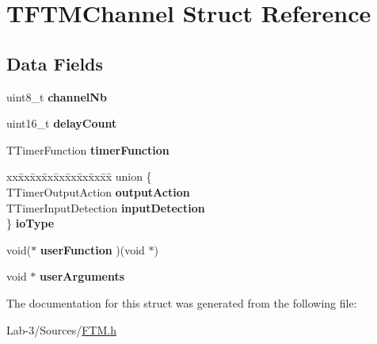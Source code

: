 \hypertarget{struct_t_f_t_m_channel}{}\section{T\+F\+T\+M\+Channel Struct Reference}
\label{struct_t_f_t_m_channel}
\subsection*{Data Fields}
\begin{DoxyCompactItemize}
\item 
\mbox{\label{struct_t_f_t_m_channel_aab42c6eab5f91f06695b7f8f5a9f67d1}} 
uint8\+\_\+t {\bfseries channel\+Nb}
\item 
\mbox{\label{struct_t_f_t_m_channel_a3dac86840880de76e5c0c0500b5106b7}} 
uint16\+\_\+t {\bfseries delay\+Count}
\item 
\mbox{\label{struct_t_f_t_m_channel_af19e06614bed61e209faf9cc49f16c27}} 
T\+Timer\+Function {\bfseries timer\+Function}
\item 
\mbox{\label{struct_t_f_t_m_channel_adf841e817aa690e9e3442d41cd6a7504}} 
\begin{tabbing}
xx\=xx\=xx\=xx\=xx\=xx\=xx\=xx\=xx\=\kill
union \{\\
\>TTimerOutputAction {\bfseries outputAction}\\
\>TTimerInputDetection {\bfseries inputDetection}\\
\} {\bfseries ioType}\\

\end{tabbing}\item 
\mbox{\label{struct_t_f_t_m_channel_a3cd6c8da6cd5c741b3d3ab86a4ac1332}} 
void($\ast$ {\bfseries user\+Function} )(void $\ast$)
\item 
\mbox{\label{struct_t_f_t_m_channel_a7e33f4f600959dc2bcfa062a4a36f7b9}} 
void $\ast$ {\bfseries user\+Arguments}
\end{DoxyCompactItemize}


The documentation for this struct was generated from the following file\+:\begin{DoxyCompactItemize}
\item 
Lab-\/3/\+Sources/\hyperlink{_f_t_m_8h}{F\+T\+M.\+h}\end{DoxyCompactItemize}
